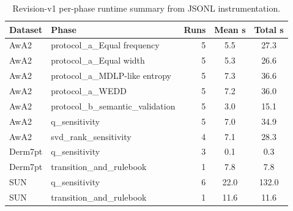 \begin{table}[H]
\caption{Revision-v1 per-phase runtime summary from JSONL instrumentation.\label{tab:runtime_breakdown}}
\centering
\small
\begin{tabular}{llrcc}
\toprule
Dataset & Phase & Runs & Mean s & Total s \\
\midrule
AwA2 & protocol\_a\_Equal frequency & 5 & 5.5 & 27.3 \\
AwA2 & protocol\_a\_Equal width & 5 & 5.3 & 26.6 \\
AwA2 & protocol\_a\_MDLP-like entropy & 5 & 7.3 & 36.6 \\
AwA2 & protocol\_a\_WEDD & 5 & 7.2 & 36.0 \\
AwA2 & protocol\_b\_semantic\_validation & 5 & 3.0 & 15.1 \\
AwA2 & q\_sensitivity & 5 & 7.0 & 34.9 \\
AwA2 & svd\_rank\_sensitivity & 4 & 7.1 & 28.3 \\
Derm7pt & q\_sensitivity & 3 & 0.1 & 0.3 \\
Derm7pt & transition\_and\_rulebook & 1 & 7.8 & 7.8 \\
SUN & q\_sensitivity & 6 & 22.0 & 132.0 \\
SUN & transition\_and\_rulebook & 1 & 11.6 & 11.6 \\
\bottomrule
\end{tabular}
\end{table}
